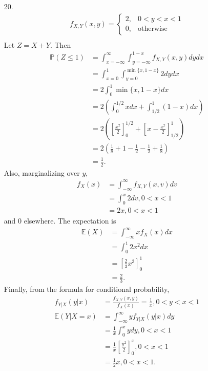 \documentclass[a4paper,12pt]{article}
\begin{document}
\begin{enumerate}
    \item[20.] 
        \begin{align*}
            f_{X, Y}(x, y) =
            \begin{cases}
                2, &0 < y < x < 1 \\
                0, &\text{otherwise}
            \end{cases} \\
        \end{align*}
        Let $Z = X + Y$. Then
        \begin{align*}
            \mathbb{P}(Z \leq 1) &= \int_{x = -\infty}^\infty \int_{y = -\infty}^{1 - x} f_{X, Y}(x, y) dy dx \\
            &= \int_{x = 0}^1 \int_{y = 0}^{\min\{x, 1 - x\}} 2 dy dx \\
            &= 2 \int_0^1 \min\{x, 1 - x\} dx \\
            &= 2 \left( \int_0^{1/2} x dx + \int_{1/2}^1 (1 - x) dx \right) \\
            &= 2 \left( \left[ \frac{x^2}{2} \right]_0^{1/2} + \left[ x - \frac{x^2}{2} \right]_{1/2}^1 \right) \\
            &= 2 \left( \frac{1}{8} + 1 - \frac{1}{2} - \frac{1}{2} + \frac{1}{8} \right) \\
            &= \frac{1}{2}.
        \end{align*}
        Also, marginalizing over $y$,
        \begin{align*}
            f_X(x) &= \int_{-\infty}^\infty f_{X, Y}(x, v) dv \\
            &= \int_0^x 2 dv, 0 < x < 1 \\
            &= 2x, 0 < x < 1
        \end{align*}
        and $0$ elsewhere. The expectation is
        \begin{align*}
            \mathbb{E}(X) &= \int_{-\infty}^\infty x f_X(x) dx \\
            &= \int_0^1 2x^2 dx \\
            &= \left[ \frac{2}{3} x^3 \right]_0^1 \\
            &= \frac{2}{3}.
        \end{align*}
        Finally, from the formula for conditional probability,
        \begin{align*}
            f_{Y | X}(y | x) &= \frac{f_{X, Y}(x, y)}{f_X(x)} = \frac{1}{x}, 0 < y < x < 1 \\
            \mathbb{E}(Y | X = x) &= \int_{-\infty}^\infty y f_{Y | X}(y | x) dy \\
            &= \frac{1}{x} \int_0^x y dy, 0 < x < 1 \\
            &= \frac{1}{x} \left[ \frac{y^2}{2} \right]_0^x, 0 < x < 1 \\
            &= \frac{1}{2}x, 0 < x < 1.
        \end{align*}


\end{enumerate}
\end{document}
